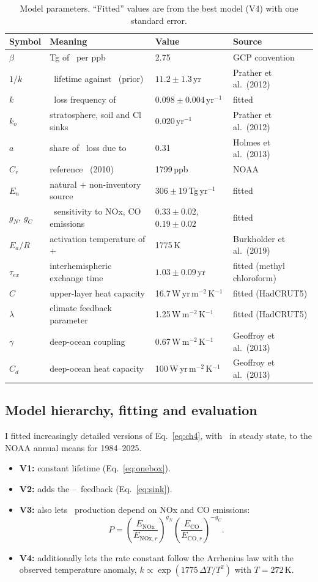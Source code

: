 \documentclass[11pt,a4paper]{article}
\newcommand{\CH}{\ce{CH4}}
\newcommand{\OH}{\ce{OH}}
\begin{document}
\begin{table}[t]
\centering\small
\caption{Model parameters. ``Fitted'' values are from the best model (V4) with one standard error.}
\label{tab:params}
\begin{tabular}{llll}
\toprule
Symbol & Meaning & Value & Source\\
\midrule
$\beta$ & Tg of \CH\ per ppb & 2.75 & GCP convention\\
$1/k$ & \CH\ lifetime against \OH\ (prior) & $11.2\pm1.3$\,yr & Prather et al.\ (2012)\\
$k$ & \OH\ loss frequency of \CH & $0.098\pm0.004$\,yr$^{-1}$ & fitted\\
$k_o$ & stratosphere, soil and Cl sinks & 0.020\,yr$^{-1}$ & Prather et al.\ (2012)\\
$a$ & share of \OH\ loss due to \CH & 0.31 & Holmes et al.\ (2013)\\
$C_r$ & reference \CH\ (2010) & 1799\,ppb & NOAA\\
$E_n$ & natural + non-inventory source & $306\pm19$\,Tg\,yr$^{-1}$ & fitted\\
$g_N$, $g_C$ & \OH\ sensitivity to NOx, CO emissions & $0.33\pm0.02$, $0.19\pm0.02$ & fitted\\
$E_a/R$ & activation temperature of \CH+\OH & 1775\,K & Burkholder et al.\ (2019)\\
$\tau_{ex}$ & interhemispheric exchange time & $1.03\pm0.09$\,yr & fitted (methyl chloroform)\\
$C$ & upper-layer heat capacity & 16.7\,W\,yr\,m$^{-2}$\,K$^{-1}$ & fitted (HadCRUT5)\\
$\lambda$ & climate feedback parameter & 1.25\,W\,m$^{-2}$\,K$^{-1}$ & fitted (HadCRUT5)\\
$\gamma$ & deep-ocean coupling & 0.67\,W\,m$^{-2}$\,K$^{-1}$ & Geoffroy et al.\ (2013)\\
$C_d$ & deep-ocean heat capacity & 100\,W\,yr\,m$^{-2}$\,K$^{-1}$ & Geoffroy et al.\ (2013)\\
\bottomrule
\end{tabular}
\end{table}

\subsection{Model hierarchy, fitting and evaluation}
I fitted increasingly detailed versions of Eq.~\eqref{eq:ch4}, with \OH\ in steady state, to the NOAA annual means for 1984--2025.
\begin{itemize}\itemsep0pt
\item \textbf{V1:} constant lifetime (Eq.~\ref{eq:onebox}).
\item \textbf{V2:} adds the \CH--\OH\ feedback (Eq.~\ref{eq:sink}).
\item \textbf{V3:} also lets \OH\ production depend on NOx and CO emissions:
\[P=\left(\frac{E_{\mathrm{NOx}}}{E_{\mathrm{NOx},r}}\right)^{g_N}\left(\frac{E_{\mathrm{CO}}}{E_{\mathrm{CO},r}}\right)^{-g_C}.\]
\item \textbf{V4:} additionally lets the rate constant follow the Arrhenius law with the observed temperature anomaly, $k\propto \exp(1775\,\Delta T/T^2)$ with $T=272$\,K.
\end{itemize}
\end{document}
